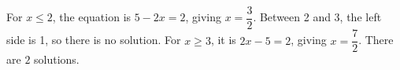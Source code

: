 For $x\le2$, the equation is $5-2x=2$, giving $x=\dfrac{3}{2}$. Between 2 and 3, the left side is 1, so there is no solution. For $x\ge3$, it is $2x-5=2$, giving $x=\dfrac{7}{2}$. There are $\boxed2$ solutions.

